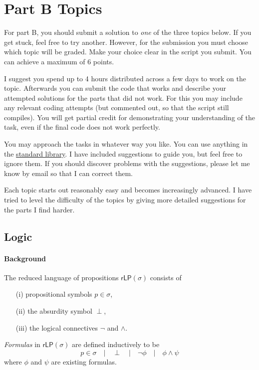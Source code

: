 \documentclass{article}[12pt]
\theoremstyle{definition}
\begin{document}
\section{Part B Topics}
For part B, you should submit a solution to \emph{one} of the three topics below. If you get stuck, feel free to try another. However, for the submission you must choose which topic will be graded. Make your choice clear in the script you submit. You can achieve a maximum of 6 points.

I suggest you spend up to 4 hours distributed across a few days to work on the topic. Afterwards you can submit the code that works and describe your attempted solutions for the parts that did not work. For this you may include any relevant coding attempts (but commented out, so that the script still compiles). You will get partial credit for demonstrating your understanding of the task, even if the final code does not work perfectly.

You may approach the tasks in whatever way you like. You can use anything in the \href{https://hackage.haskell.org/package/base}{standard library}. I have included suggestions to guide you, but feel free to ignore them. If you should discover problems with the suggestions, please let me know by email so that I can correct them. 

Each topic starts out reasonably easy and becomes increasingly advanced. I have tried to level the difficulty of the topics by giving more detailed suggestions for the parts I find harder.

\subsection{Logic}
\noindent{}

\paragraph{Background} The reduced language of propositions $\mathsf{rLP}(\sigma)$ consists of
\begin{itemize}
    \item[(i)] propositional symbols $p \in \sigma$,
    \item[(ii)] the absurdity symbol $\perp$,
    \item[(iii)] the logical connectives $\neg$ and $\wedge$.
\end{itemize}
\emph{Formulas} in $\mathsf{rLP}(\sigma)$ are defined inductively to be 
$$ p \in \sigma \quad \vert \quad \perp \quad \vert \quad \neg \phi \quad \vert \quad \phi \wedge \psi $$
where $\phi$ and $\psi$ are existing formulas. 
\end{document}
